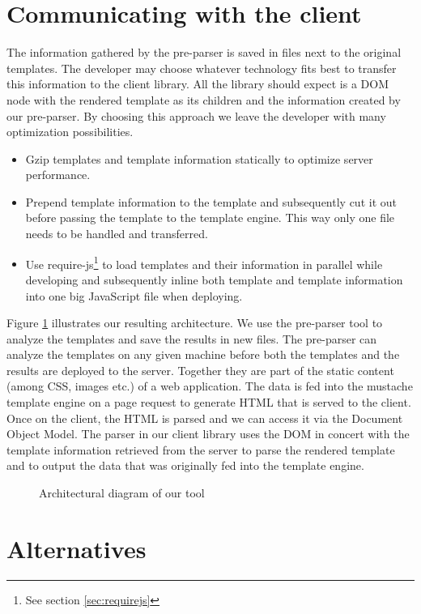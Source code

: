 \documentclass[thesis.tex]{subfiles}
\begin{document}
\section{Communicating with the client}

The information gathered by the pre-parser is saved in files next to the
original templates. The developer may choose whatever technology fits best to
transfer this information to the client library. All the library should expect
is a DOM node with the rendered template as its children and the information
created by our pre-parser.
By choosing this approach we leave the developer with many optimization
possibilities.
\begin{itemize}
\item Gzip templates and template information statically to optimize
	server performance.
\item Prepend template information to the template and subsequently
	cut it out before passing the template to the template engine.
	This way only one file needs to be handled and transferred.
\item Use require-js\footnote{See section \ref{sec:requirejs}}
	to load templates and their information in parallel
	while developing and subsequently inline both template and
	template information into one big JavaScript file when deploying.
\end{itemize}

Figure \ref{fig:architecture} illustrates our resulting architecture.
We use the pre-parser tool to analyze the templates and save the results in new
files. The pre-parser can analyze the templates on any given machine before
both the templates and the results are deployed to the server. Together they
are part of the static content (among CSS, images etc.) of a web application.
The data is fed into the mustache template engine on a page request to generate
HTML that is served to the client. Once on the client, the HTML is parsed and we
can access it via the Document Object Model. The parser in our client library
uses the DOM in concert with the template information retrieved from the server
to parse the rendered template and to output the data that was originally fed
into the template engine.
\begin{figure}
	\centering
	\resizebox{\linewidth}{!}{}
	\caption{Architectural diagram of our tool}
	\label{fig:architecture}
\end{figure}

\section{Alternatives}
\end{document}
